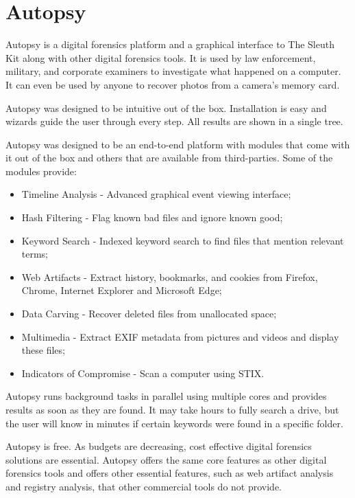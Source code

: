 \section{Autopsy}

Autopsy is a digital forensics platform and a graphical interface to The Sleuth Kit
along with other digital forensics tools. It is used by law enforcement, military, 
and corporate examiners to investigate what happened on a computer. It can even 
be used by anyone to recover photos from a camera's memory card.

Autopsy was designed to be intuitive out of the box. Installation is easy and
wizards guide the user through every step. All results are shown in a single tree.

Autopsy was designed to be an end-to-end platform with modules that come with
it out of the box and others that are available from third-parties. Some of the
modules provide:

\begin{itemize}
\item Timeline Analysis - Advanced graphical event viewing interface;
\item Hash Filtering - Flag known bad files and ignore known good;
\item Keyword Search - Indexed keyword search to find files that mention relevant
terms;
\item Web Artifacts - Extract history, bookmarks, and cookies from Firefox, Chrome,
Internet Explorer and Microsoft Edge;
\item Data Carving - Recover deleted files from unallocated space;
\item Multimedia - Extract EXIF metadata from pictures and videos and display these files;
\item Indicators of Compromise - Scan a computer using STIX.
\end{itemize}

Autopsy runs background tasks in parallel using multiple cores and provides results as soon as they are found.
It may take hours to fully search a drive, but the user will know in minutes if certain keywords were found in a specific folder.

Autopsy is free. As budgets are decreasing, cost effective digital forensics solutions are essential. Autopsy offers
the same core features as other digital forensics tools and offers other essential features, such as web artifact analysis
and registry analysis, that other commercial tools do not provide.

